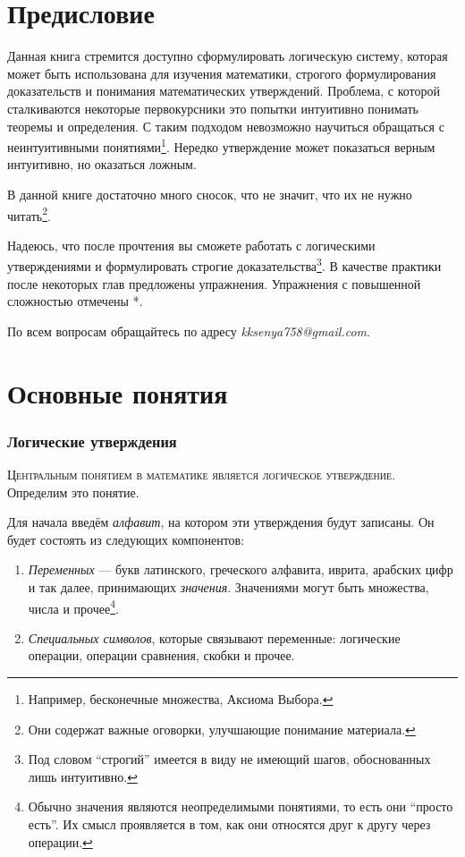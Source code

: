 \part{Предисловие}

Данная книга стремится доступно сформулировать логическую систему,
которая может быть использована для изучения математики, строгого
формулирования доказательств и понимания математических утверждений.
Проблема, с которой сталкиваются некоторые первокурсники это попытки
интуитивно понимать теоремы и определения. С таким подходом невозможно
научиться обращаться с неинтуитивными
понятиями\footnote{Например, бесконечные множества, Аксиома Выбора.}.
Нередко утверждение может показаться верным интуитивно,
но оказаться ложным.

В данной книге достаточно много сносок, что не значит, что их
не нужно читать\footnote{Они содержат важные оговорки,
	улучшающие понимание материала.}.

Надеюсь, что после прочтения вы сможете работать с логическими
утверждениями и формулировать строгие доказательства\footnote{Под словом ``строгий''
	имеется в виду не имеющий шагов, обоснованных лишь интуитивно.}. В качестве практики
после некоторых глав предложены упражнения. Упражнения с повышенной сложностью
отмечены *.

По всем вопросам обращайтесь по адресу {\sl kksenya758@gmail.com}.

\part{Основные понятия}

\section{Логические утверждения}

\textsc{Центральным понятием в математике является логическое утверждение.}
Определим это понятие.

Для начала введём {\it алфавит}, на котором эти утверждения будут записаны.
Он будет состоять из следующих компонентов:
\begin{enumerate}
	\item{}{\it Переменных} --- букв латинского, греческого алфавита,
	иврита, арабских цифр и так далее, принимающих {\it значения}.
	Значениями могут быть множества, числа и прочее\footnote{Обычно значения
		являются неопределимыми понятиями, то есть они ``просто есть''. Их смысл
		проявляется в том, как они относятся друг к другу через операции.}.
	\item{}{\it Специальных символов}, которые связывают переменные:
	логические операции, операции сравнения, скобки и прочее.
\end{enumerate}

